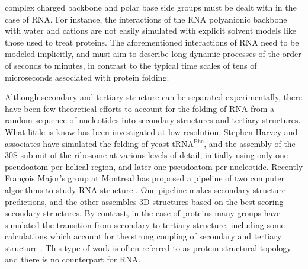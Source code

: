 complex charged backbone and polar base side groups must be dealt with
in the case of RNA.
For instance,  the interactions of  the RNA polyanionic  backbone with
water  and cations  \cite{klein2004a}  are not  easily simulated  with
explicit   solvent  models   like those used to treat   proteins.  The
aforementioned interactions of RNA  need to be modeled implicitly, and
must aim to describe long dynamic processes of the order of seconds to
minutes,  in  contrast   to  the  typical  time  scales   of  tens  of
microseconds associated with protein folding.

Although   secondary   and  tertiary   structure   can  be   separated
experimentally, there have been few theoretical efforts to account for
the  folding  of  RNA  from  a random  sequence  of  nucleotides  into
secondary structures and tertiary  structures. What little is know has
been  investigated at  low resolution.  Stephen Harvey  and associates
have   simulated   the   folding   of   yeast   tRNA$^{\textrm{Phe}}$,
\cite{malhotra1990}  and  the  assembly  of  the 30S  subunit  of  the
ribosome \cite{stagg2003} at various levels of detail, initially using
only one pseudoatom  per helical region, and later  one pseudoatom per
nucleotide.  Recently  Fran\c{c}ois  Major's  group  at  Montreal  has
proposed a pipeline of two  computer algorithms to study RNA structure
\cite{parisien2008}.   One    pipeline   makes   secondary   structure
predictions, and the  other assembles 3D structures based  on the best
scoring secondary structures.
By contrast,  in the case of  proteins many groups  have simulated the
transition  from  secondary  to  tertiary  structure,  including  some
calculations which  account for the  strong coupling of  secondary and
tertiary  structure   \cite{westhead1999,  gerstein2003,  meiler2003}.
This type of work is  often referred to as protein structural topology
and there is no counterpart for RNA.

